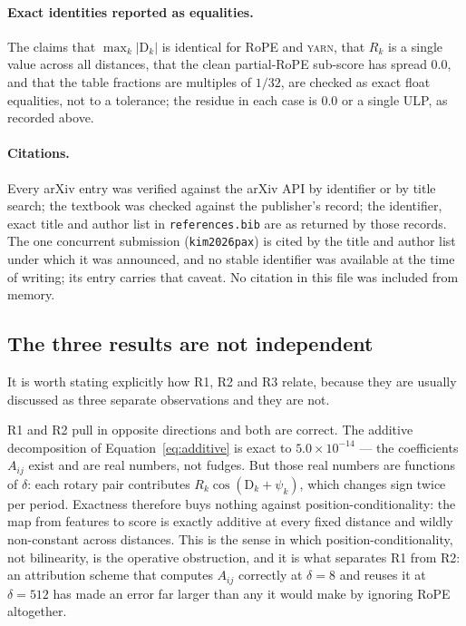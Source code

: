 \documentclass{article}
\theoremstyle{plain}
\theoremstyle{remark}
\newcommand{\yarn}{\textsc{yarn}}
\newcommand{\D}{\mathrm{D}_k}
\newcommand{\Rk}{R_k}
\newcommand{\psik}{\psi_k}
\begin{document}
\paragraph{Exact identities reported as equalities.} The claims that
$\max_k|\D|$ is identical for RoPE and \yarn, that $\Rk$ is a single value
across all distances, that the clean partial-RoPE sub-score has spread
$0.0$, and that the table fractions are multiples of $1/32$, are checked as
exact float equalities, not to a tolerance; the residue in each case is
$0.0$ or a single ULP, as recorded above.

\paragraph{Citations.} Every arXiv entry was verified against the arXiv API by
identifier or by title search; the textbook was checked against the publisher's
record; the identifier, exact title and author list in
\texttt{references.bib} are as returned by those records. The one concurrent
submission (\texttt{kim2026pax}) is cited by the title and author list under
which it was announced, and no stable identifier was available at the time of
writing; its entry carries that caveat. No citation in this file was included
from memory.


\subsection{The three results are not independent}
\label{sec:synthesis}

It is worth stating explicitly how R1, R2 and R3 relate, because they are
usually discussed as three separate observations and they are not.

R1 and R2 pull in opposite directions and both are correct. The additive
decomposition of Equation~\ref{eq:additive} is exact to
$5.0\times10^{-14}$ --- the coefficients $A_{ij}$ exist and are real numbers,
not fudges. But those real numbers are functions of $\delta$: each rotary pair
contributes $\Rk\cos(\D + \psik)$, which changes sign twice per period. Exactness
therefore buys nothing
against position-conditionality: the map from features to score is exactly
additive at every fixed distance and wildly non-constant across distances. This
is the sense in which position-conditionality, not bilinearity, is the operative
obstruction, and it is what separates R1 from R2: an attribution scheme that
computes $A_{ij}$ correctly at $\delta = 8$ and reuses it at $\delta = 512$ has
made an error far larger than any it would make by ignoring RoPE altogether.
\end{document}
